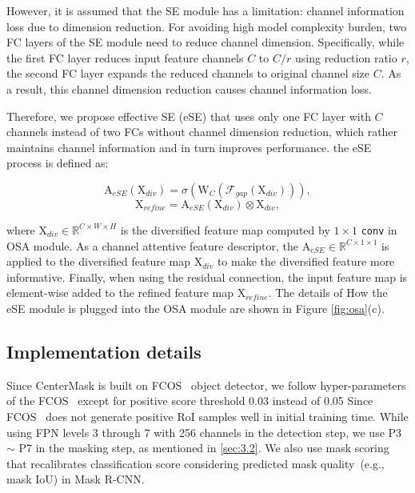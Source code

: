 \documentclass[10pt,twocolumn,letterpaper]{article}
\begin{document}
However, it is assumed that the SE module has a limitation: channel information loss due to dimension reduction. 
For avoiding high model complexity burden, two FC layers of the SE module need to reduce channel dimension.
Specifically, while the first FC layer reduces input feature channels $C$ to $C/r$ using reduction ratio $r$, the second FC layer expands the reduced channels to original channel size $C$.
As a result, this channel dimension reduction causes channel information loss.

Therefore, we propose effective SE (eSE) that uses only one FC layer with $C$ channels instead of two FCs without channel dimension reduction, which rather maintains channel information and in turn improves performance. the eSE process is defined as:

\begin{equation} \label{eq:6}
\mathrm{A}_{eSE}(\mathrm{X}_{div}) = \sigma(\mathrm{W}_{C}(\mathcal{F}_{gap}(\mathrm{X}_{div}))),
\end{equation}
\begin{equation} \label{eq:7}
\mathrm{X}_{refine} = \mathrm{A}_{eSE}(\mathrm{X}_{div}) \otimes \mathrm{X}_{div},
\end{equation}


\noindent
where $\mathrm{X}_{div} \in \mathbb{R}^{C \times W \times H}$ is the diversified feature map computed by $1\times1$ \texttt{conv} in OSA module.
As a channel attentive feature descriptor, the $\mathrm{A}_{eSE} \in \mathbb{R}^{C \times 1 \times 1}$ is applied to the diversified feature map $\mathrm{X}_{div}$ to make the diversified feature more informative. Finally, when using the residual connection, the input feature map is element-wise added to the refined feature map $\mathrm{X}_{refine}$.
The details of How the eSE module is plugged into the OSA module are shown in Figure \ref{fig:osa}(c).




\subsection{Implementation details}
Since CenterMask is built on FCOS~\cite{Tian_2019_ICCV} object detector, we follow hyper-parameters of the FCOS~\cite{Tian_2019_ICCV} except for positive score threshold 0.03 instead of 0.05 Since FCOS~\cite{Tian_2019_ICCV} does not generate positive RoI samples well in initial training time.
While using FPN levels 3 through 7 with 256 channels in the detection step, we use P3 $\sim$ P7 in the masking step, as mentioned in \ref{sec:3.2}.
We also use mask scoring~\cite{huang2019mask} that recalibrates classification score considering predicted mask quality~(e.g., mask IoU) in Mask R-CNN.
\end{document}
